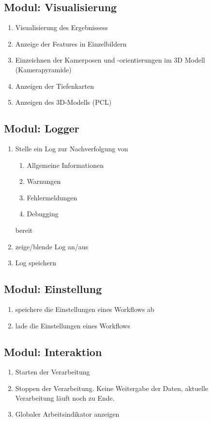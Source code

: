	\subsection{Modul: Visualisierung}
		\begin{enumerate}[ align=left, label={\textbf{\textbackslash FM3\arabic*0\textbackslash}} ]
			\item Visualisierung des Ergebnissess
			\item Anzeige der Features in Einzelbildern
			\item Einzeichnen der Kamerposen und -orientierungen im 3D Modell (Kamerapyramide)
			\item Anzeigen der Tiefenkarten
			\item Anzeigen des 3D-Modells (PCL)
		\end{enumerate}

	\subsection{Modul: Logger}
		\begin{enumerate}[ align=left, label={\textbf{\textbackslash FM4\arabic*0\textbackslash}} ]
			\item Stelle ein Log zur Nachverfolgung von
			\begin{enumerate}[ align=left, label={\textbf{\textbackslash FM41\arabic*\textbackslash}} ]
			\item Allgemeine Informationen
			\item Warnungen
			\item Fehlermeldungen
			\item Debugging
		\end{enumerate}
		bereit
		\item zeige/blende Log an/aus
		\item Log speichern
	\end{enumerate}

	\subsection{Modul: Einstellung}
		\begin{enumerate}[ align=left, label={\textbf{\textbackslash FM5\arabic*0\textbackslash}} ]
			\item speichere die Einstellungen eines Workflows ab
			\item lade die Einstellungen eines Workflows
		\end{enumerate}

	\subsection{Modul: Interaktion}
		\begin{enumerate}[ align=left, label={\textbf{\textbackslash FM6\arabic*0\textbackslash}} ]
			\item Starten der Verarbeitung
			\item Stoppen der Verarbeitung. Keine Weitergabe der Daten, aktuelle Verarbeitung läuft noch zu Ende.
			\item Globaler Arbeitsindikator anzeigen
		\end{enumerate}	

